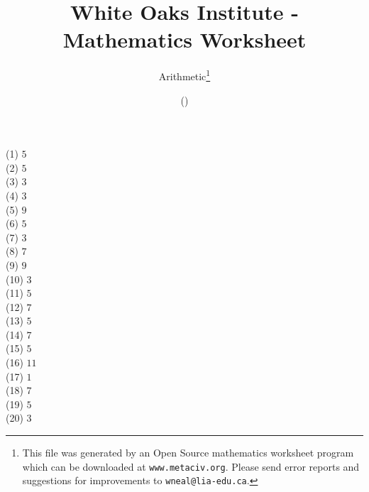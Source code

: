 \documentclass[letter]{article}
\begin{document}
\title{White Oaks Institute - Mathematics Worksheet}
\author{Arithmetic\thanks{This file was generated by an \textsf{Open Source} mathematics worksheet program which can be downloaded at \texttt{www.metaciv.org}. Please send error reports and suggestions for improvements to \texttt{wneal@lia-edu.ca}.}}
\date{\XCfileversion{} (\XCfiledate)}
\maketitle
\begin{multicols}{2}(1) $5$\\(2) $5$\\(3) $3$\\(4) $3$\\(5) $9$\\(6) $5$\\(7) $3$\\(8) $7$\\(9) $9$\\(10) $3$\\(11) $5$\\(12) $7$\\(13) $5$\\(14) $7$\\(15) $5$\\(16) $11$\\(17) $1$\\(18) $7$\\(19) $5$\\(20) $3$\end{multicols}
\end{document}
